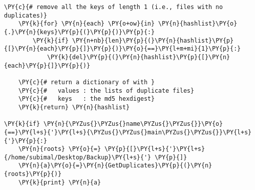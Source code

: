 \begin{Verbatim}[commandchars=\\\{\}]
    \PY{c}{# remove all the keys of length 1 (i.e., files with no duplicates)}
    \PY{k}{for} \PY{n}{each} \PY{o+ow}{in} \PY{n}{hashlist}\PY{o}{.}\PY{n}{keys}\PY{p}{(}\PY{p}{)}\PY{p}{:}
        \PY{k}{if} \PY{n+nb}{len}\PY{p}{(}\PY{n}{hashlist}\PY{p}{[}\PY{n}{each}\PY{p}{]}\PY{p}{)}\PY{o}{==}\PY{l+m+mi}{1}\PY{p}{:}
            \PY{k}{del}\PY{p}{(}\PY{n}{hashlist}\PY{p}{[}\PY{n}{each}\PY{p}{]}\PY{p}{)}

    \PY{c}{# return a dictionary of with }
    \PY{c}{#   values : the lists of duplicate files}
    \PY{c}{#   keys   : the md5 hexdigest}
    \PY{k}{return} \PY{n}{hashlist}

\PY{k}{if} \PY{n}{\PYZus{}\PYZus{}name\PYZus{}\PYZus{}}\PY{o}{==}\PY{l+s}{'}\PY{l+s}{\PYZus{}\PYZus{}main\PYZus{}\PYZus{}}\PY{l+s}{'}\PY{p}{:}
    \PY{n}{roots} \PY{o}{=} \PY{p}{[}\PY{l+s}{'}\PY{l+s}{/home/subimal/Desktop/Backup}\PY{l+s}{'} \PY{p}{]}
    \PY{n}{a}\PY{o}{=}\PY{n}{GetDuplicates}\PY{p}{(}\PY{n}{roots}\PY{p}{)}
    \PY{k}{print} \PY{n}{a}
\end{Verbatim}
